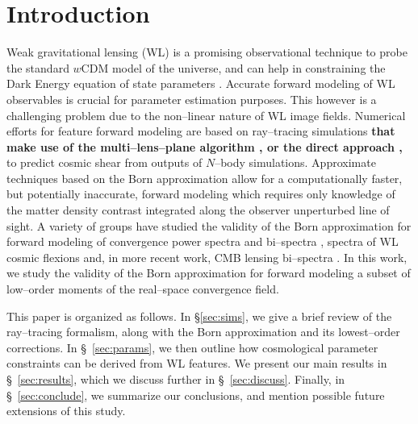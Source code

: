 \documentclass[reprint,aps,prd,superscriptaddress,showkeys,showpacs]{revtex4-1}
\begin{document}

\maketitle



\section{Introduction}
%
Weak gravitational lensing (WL) is a promising observational technique to probe the standard $w$CDM model of the universe, and can help in constraining the Dark Energy equation of state parameters \citep{wlreview}. Accurate forward modeling of WL observables is crucial for parameter estimation purposes. This however is a challenging problem due to the non--linear nature of WL image fields. Numerical efforts for feature forward modeling are based on ray--tracing simulations \textbf{\color{red} that make use of the multi--lens--plane algorithm \citep{RayTracingJain,RayTracingHartlap,RayTracingPN}, or the direct approach \citep{RayTracingBarreira},} to predict cosmic shear from outputs of $N$--body simulations. Approximate techniques based on the Born approximation allow for a computationally faster, but potentially inaccurate, forward modeling \citep{RayTracingHartlap} which requires only knowledge of the matter density contrast integrated along the observer unperturbed line of sight. A variety of groups have studied the validity of the Born approximation for forward modeling of convergence power spectra \citep{HirataKrause} and bi--spectra \citep{WLBispectrumDodelson}, spectra of WL cosmic flexions \citep{BornFlexion} and, in more recent work, CMB lensing bi--spectra \citep{CMBPrattenLewis}. In this work, we study the validity of the Born approximation for forward modeling a subset of low--order moments of the real--space convergence field. 

This paper is organized as follows.  In \S\ref{sec:sims}, we give a brief review of the ray--tracing formalism, along with the Born approximation and its lowest--order corrections. In \S~\ref{sec:params}, we then outline how cosmological parameter constraints can be derived from WL features. We present our main results in \S~\ref{sec:results}, which we discuss further in \S~\ref{sec:discuss}.  Finally, in \S~\ref{sec:conclude}, we summarize our conclusions, and mention possible future extensions of this study.       
\end{document}
